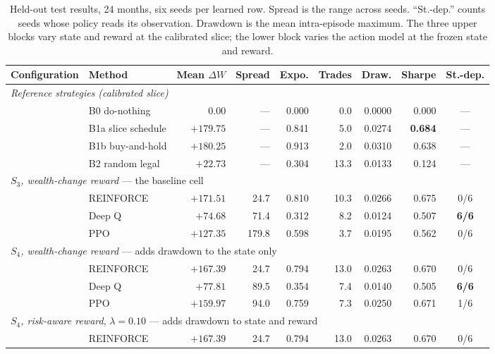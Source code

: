 \begin{table}[h]
\centering
\caption{Held-out test results, 24 months, six seeds per learned row. Spread is
the range across seeds. ``St.-dep.'' counts seeds whose policy reads its
observation. Drawdown is the mean intra-episode maximum. The three upper blocks
vary state and reward at the calibrated slice; the lower block varies the action
model at the frozen state and reward.}
\label{tab:res_final}
\small
\begin{tabular}{llrrrrrrc}
\toprule
\textbf{Configuration} & \textbf{Method} & \textbf{Mean $\Delta W$} &
\textbf{Spread} & \textbf{Expo.} & \textbf{Trades} & \textbf{Draw.} &
\textbf{Sharpe} & \textbf{St.-dep.} \\
\midrule
\multicolumn{9}{l}{\emph{Reference strategies (calibrated slice)}} \\
& B0 do-nothing      & $0.00$    & ---    & 0.000 & 0.0  & 0.0000 & 0.000 & --- \\
& B1a slice schedule & $+179.75$ & ---    & 0.841 & 5.0  & 0.0274 & \textbf{0.684} & --- \\
& B1b buy-and-hold   & $\mathbf{+180.25}$ & --- & 0.913 & 2.0 & 0.0310 & 0.638 & --- \\
& B2 random legal    & $+22.73$  & ---    & 0.304 & 13.3 & 0.0133 & 0.124 & --- \\
\midrule
\multicolumn{9}{l}{\emph{$S_3$, wealth-change reward} --- the baseline cell} \\
& REINFORCE & $+171.51$ & 24.7  & 0.810 & 10.3 & 0.0266 & 0.675 & 0/6 \\
& Deep Q    & $+74.68$  & 71.4  & 0.312 & 8.2  & 0.0124 & 0.507 & \textbf{6/6} \\
& PPO       & $+127.35$ & 179.8 & 0.598 & 3.7  & 0.0195 & 0.562 & 0/6 \\
\midrule
\multicolumn{9}{l}{\emph{$S_4$, wealth-change reward} --- adds drawdown to the state only} \\
& REINFORCE & $+167.39$ & 24.7  & 0.794 & 13.0 & 0.0263 & 0.670 & 0/6 \\
& Deep Q    & $+77.81$  & 89.5  & 0.354 & 7.4  & 0.0140 & 0.505 & \textbf{6/6} \\
& PPO       & $+159.97$ & 94.0  & 0.759 & 7.3  & 0.0250 & 0.671 & 1/6 \\
\midrule
\multicolumn{9}{l}{\emph{$S_4$, risk-aware reward}, $\lambda = 0.10$ --- adds drawdown to state and reward} \\
& REINFORCE & $+167.39$ & 24.7  & 0.794 & 13.0 & 0.0263 & 0.670 & 0/6 \\

\end{tabular}
\end{table}
